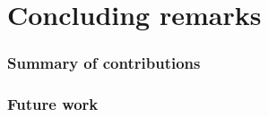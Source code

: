 \chapter{Concluding remarks}
\label{chap:conclusions}

\subsection{Summary of contributions}

\subsection{Future work}